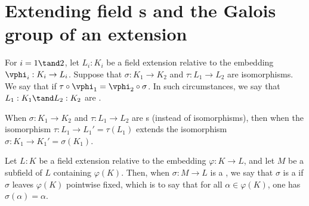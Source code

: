 \documentclass{article}
\begin{document}

\setcounter{tdefinition}{15}
\setcounter{section}{2}
\section{Extending field \homo s and the Galois group of an extension}
  \begin{tdefinition}
    For $i = 1 \tand 2$, let $L_i : K_i$ be a field extension relative to the embedding $\vphi_i : K_i\to L_i$.
    Suppose that $ \sigma : K_1\to K_2 $ and $ \tau:L_1\to L_2 $ are isomorphisms.
    We say that  if $ \tau\circ\vphi_1 = \vphi_2\circ\sigma $.
    In such circumstances, we say that $L_1 : K_1 \tand L_2 : K_2$ are .

    When $ \sigma:K_1\to K_2 $ and $ \tau:L_1\to L_2 $ are \homo s (instead of isomorphisms), then   when the isomorphism $ \tau:L_1\to L_1' = \tau(L_1) $ extends the isomorphism $ \sigma:K_1\to K_1' = \sigma(K_1) $.
  \end{tdefinition}

  \begin{tdefinition}[$F$-\homo]
    Let \(L : K\) be a field extension relative to the embedding \(\varphi : K \to L\), and let \(M\) be a subfield of \(L\) containing \(\varphi(K)\).
    Then, when \(\sigma : M \to L\) is a \homo , we say that \(\sigma\) is a  if \(\sigma\) leaves \(\varphi(K)\) pointwise fixed, which is to say that for all \(\alpha \in \varphi(K)\), one has $\sigma(\alpha) = \alpha$.
  \end{tdefinition}
\end{document}
